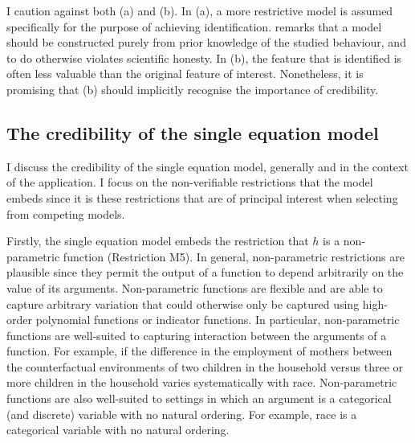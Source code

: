 \documentclass[10pt,a4paper,twoside]{article}
\newcommand\independent{\protect\mathpalette{\protect\independenT}{\perp}}
\def\independenT#1#2{\mathrel{\rlap{$#1#2$}\mkern2mu{#1#2}}}
\numberwithin{equation}{section}
\begin{document}
I caution against both (a) and (b). In (a), a more restrictive model is assumed specifically for the purpose of achieving identification. \cite{krE50} remarks that a model should be constructed purely from prior knowledge of the studied behaviour, and to do otherwise violates scientific honesty. In (b), the feature that is identified is often less valuable than the original feature of interest. Nonetheless, it is promising that (b) should implicitly recognise the importance of credibility.
\subsection{The credibility of the single equation model}
I discuss the credibility of the single equation model, generally and in the context of the application. I focus on the non-verifiable restrictions that the model embeds since it is these restrictions that are of principal interest when selecting from competing models.

Firstly, the single equation model embeds the restriction that $h$ is a non-parametric function (Restriction M5). In general, non-parametric restrictions are plausible since they permit the output of a function to depend arbitrarily on the value of its arguments. Non-parametric functions are flexible and are able to capture arbitrary variation that could otherwise only be captured using high-order polynomial functions or indicator functions. In particular, non-parametric functions are well-suited to capturing interaction between the arguments of a function. For example, if the difference in the employment of mothers between the counterfactual environments of two children in the household versus three or more children in the household varies systematically with race. Non-parametric functions are also well-suited to settings in which an argument is a categorical (and discrete) variable with no natural ordering. For example, race is a categorical variable with no natural ordering. 
\end{document}
